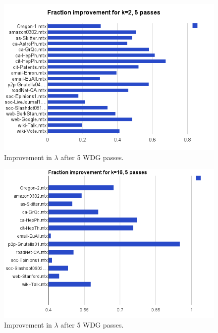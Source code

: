 \documentclass[11pt]{article}
\begin{document}
\begin{figure}[h]
\centering
\includegraphics[scale=0.70] {figures/2partfrac}
\caption[Caption for]{Improvement in $\lambda$ after 5 WDG passes.}
\end{figure}

\begin{figure}[h]
\centering
\includegraphics[scale=0.65] {figures/16partfrac}
\caption[Caption for]{Improvement in $\lambda$ after 5 WDG passes.}
\end{figure}
\end{document}
